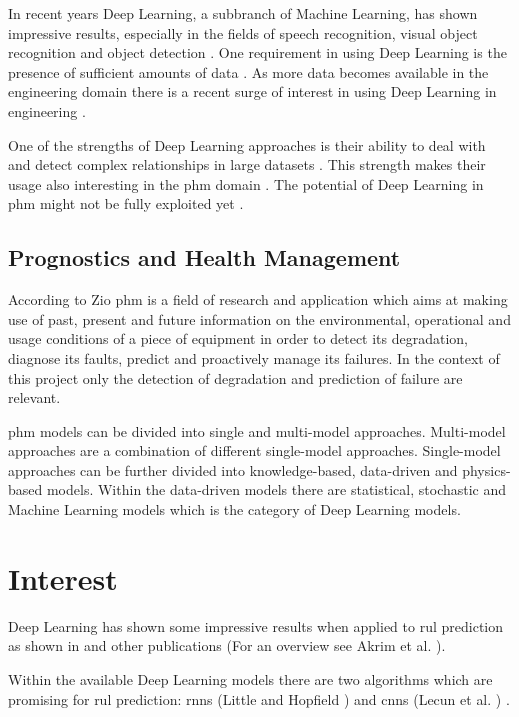 \documentclass[conference]{IEEEtran}
\begin{document}
In recent years Deep Learning, a subbranch of Machine Learning, has shown impressive results, especially in the fields of speech recognition, visual object recognition and object detection \cite{LeCun2015}. One requirement in using Deep Learning is the presence of sufficient amounts of data \cite{Sikorska2011}. As more data becomes available in the engineering domain there is a recent surge of interest in using Deep Learning in engineering \cite{Voulodimos2018}.

One of the strengths of Deep Learning approaches is their ability to deal with and detect complex relationships in large datasets \cite{MONTEROJIMENEZ2020539}. This strength makes their usage also interesting in the \gls{phm} domain \cite{Wu2015}. The potential of Deep Learning in \gls{phm} might not be fully exploited yet \cite{Akrim2021}.

\subsection{Prognostics and Health Management}

According to Zio \cite{Zio2012} \gls{phm} is a field of research and application which aims at making use of past, present and future information on the environmental, operational and usage conditions of a piece of equipment in order to detect its degradation, diagnose its faults, predict and proactively manage its failures. In the context of this project only the detection of degradation and prediction of failure are relevant.

\gls{phm} models can be divided into single and multi-model approaches. Multi-model approaches are a combination of different single-model approaches. Single-model approaches can be further divided into knowledge-based, data-driven and physics-based models. Within the data-driven models there are statistical, stochastic and Machine Learning models which is the category of Deep Learning models. \cite{MONTEROJIMENEZ2020539}

\section{Interest}
\label{sec:interest}

Deep Learning has shown some impressive results when applied to \gls{rul} prediction as shown in \cite{Xu2018, Li2018, Liu2019, Yuan2016, Wu2018, Park2020} and other publications (For an overview see Akrim et al. \cite{Akrim2021}).

Within the available Deep Learning models there are two algorithms which are promising for \gls{rul} prediction: \glspl{rnn} (Little \cite{Little1996} and Hopfield  \cite{Hopfield1982}) and \glspl{cnn} (Lecun et al. \cite{Lecun1998}) \cite{Akrim2021}.
\end{document}
